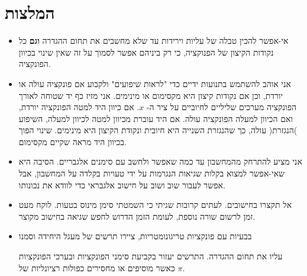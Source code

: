 

\section*{המלצות}


\begin{itemize}
\item
אי-אפשר להכין טבלה של עליות וירידות עד שלא מחשבים את תחום ההגדרה 
\textbf{וגם}
כל נקודות הקיצון של הפנוקציה, כי רק ביניהם אפשר לסמוך על זה שאין שינוי בכיוון הפונקציה.


\item
אני אוהב להשתמש בתנועות ידיים כדי "לראות שיפועים" ולקבוע אם פונקציה עולה או יורדת, וכן אם נקודות קיצון היא מקסימום או מינימים. אני מזיז כף יד שטוחה לאורך הפונקציה מערכים שליליים לחיוביים על ציר ה-%
$x$.
אם כיוון היד למטה הפונקציה יורדת, ואם הכיוון למעלה הפונקציה עולה. אם היד עוברת מכיוון למטה לכיוון למעלה, השיפוע )הנגזרת( עולה, כך שהנגזרת השנייה היא חיובית ונקודת הקיצון היא מינימים. שינוי הפוך בכיוון היד מראה שקיים מקסימום.

\item
אני מציע להתרחק מהמחשבון עד כמה שאפשר ולחשב עם סימנים אלגבריים. הסיבה היא שאי-אפשר למצוא בקלות שגיאות הנגרמות על ידי טעויות בקלדה על המחשבון, אבל אפשר לעבור שוב ושוב על חישוב אלגבראי כדי לוודא את נכונותו. 

\item
אל תקצרו בחישובים. לעתים קרובות שגיתי כי השמטתי סימן מינוס בטעות. לוקח מעט זמן לרשום שורה נוספת, לעומת הזמן הדרוש לחפש שגיאה בחישוב מקוצר.

\item
בבעיות עם פונקציות טריגונומטריות, ציירו תרשים של מעגל היחידה וסמנו 
\begin{center}
\end{center}
עליו את תחום ההגדרה. התרשים יעזור בקביעת סימני הפונקציות ובערכי הפונקציות כאשר מוסיפים או מחסירים כפולות רציונליות של 
$\pi$.


\end{itemize}
